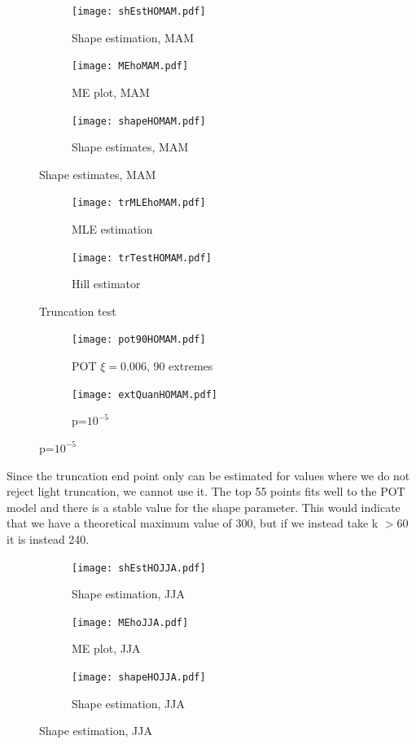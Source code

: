 \documentclass{article}
\begin{document}
	\begin{figure}[H]
		\centering
		\begin{subfigure}{0.33\textwidth}
			\texttt{[image: shEstHOMAM.pdf]}
			\caption{Shape estimation, MAM}
		\end{subfigure}%
		\begin{subfigure}{0.33\textwidth}
			\texttt{[image: MEhoMAM.pdf]}
			\caption{ME plot, MAM}
		\end{subfigure}
		\begin{subfigure}{0.33\textwidth}
			\texttt{[image: shapeHOMAM.pdf]}
			\caption{Shape estimates, MAM}
		\end{subfigure}
	\end{figure}
	
	\begin{figure}[H]
		\centering
		\begin{subfigure}{0.5\textwidth}
			\texttt{[image: trMLEhoMAM.pdf]}
			\caption{MLE estimation}
		\end{subfigure}%
		\begin{subfigure}{0.5\textwidth}
			\texttt{[image: trTestHOMAM.pdf]}
			\caption{Hill estimator}
		\end{subfigure}
		\caption{Truncation test}
	\end{figure}
	
	\begin{figure}[H]
		\centering
		\begin{subfigure}{0.5\textwidth}
			\texttt{[image: pot90HOMAM.pdf]}
			\caption{POT $\xi = 0.006$, 90 extremes}
		\end{subfigure}%
		\begin{subfigure}{0.5\textwidth}
			\texttt{[image: extQuanHOMAM.pdf]}
			\caption{p=$10^{-5}$}
		\end{subfigure}
	\end{figure}
	
	Since the truncation end point only can be estimated for values where we do not reject light truncation, we cannot use it. The top 55 points fits well to the POT model and there is a stable value for the shape parameter. This would indicate that we have a theoretical maximum value of 300, but if we instead take k $>60$ it is instead 240. 
	
	\begin{figure}[H]
		\begin{subfigure}{0.33\textwidth}
			\texttt{[image: shEstHOJJA.pdf]}
			\caption{Shape estimation, JJA}
		\end{subfigure}%
		\begin{subfigure}{0.33\textwidth}
			\texttt{[image: MEhoJJA.pdf]}
			\caption{ME plot, JJA}
		\end{subfigure}%
			\begin{subfigure}{0.33\textwidth}
			\texttt{[image: shapeHOJJA.pdf]}
			\caption{Shape estimation, JJA}
		\end{subfigure}
	\end{figure}
	
\end{document}
